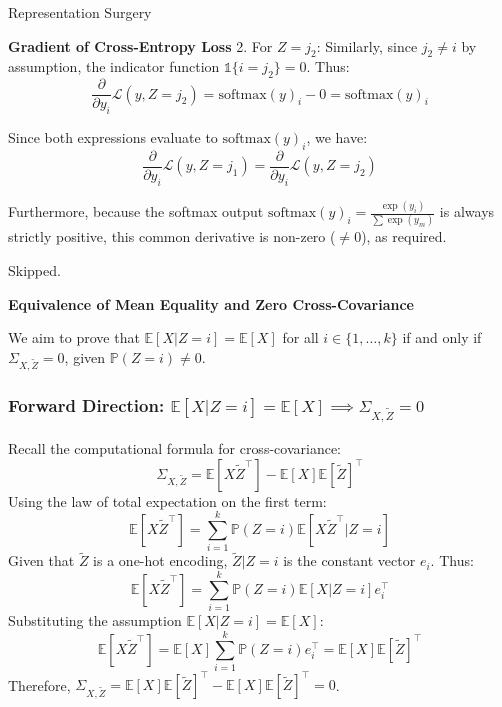 \begin{question}{Representation Surgery}
\begin{subquestion}{\textbf{Gradient of Cross-Entropy Loss}}
2. For $Z = j_2$: 
Similarly, since $j_2 \neq i$ by assumption, the indicator function $\mathbb{1}\{i=j_2\} = 0$. Thus:
$$\frac{\partial}{\partial y_i} \mathcal{L}(y, Z=j_2) = \text{softmax}(y)_i - 0 = \text{softmax}(y)_i$$

Since both expressions evaluate to $\text{softmax}(y)_i$, we have:
$$\frac{\partial}{\partial y_i} \mathcal{L}(y, Z=j_1) = \frac{\partial}{\partial y_i} \mathcal{L}(y, Z=j_2)$$

Furthermore, because the softmax output $\text{softmax}(y)_i = \frac{\exp(y_i)}{\sum \exp(y_m)}$ is always strictly positive, this common derivative is non-zero ($\ne 0$), as required.

\end{subquestion}

\begin{subquestion}
Skipped.
\end{subquestion}

\begin{subquestion}{\textbf{Equivalence of Mean Equality and Zero Cross-Covariance}}

We aim to prove that $\mathbb{E}[X|Z=i] = \mathbb{E}[X]$ for all $i \in \{1, \dots, k\}$ if and only if $\Sigma_{X,\tilde{Z}} = 0$, given $\mathbb{P}(Z=i) \neq 0$.

\subsubsection*{Forward Direction: $\mathbb{E}[X|Z=i] = \mathbb{E}[X] \implies \Sigma_{X,\tilde{Z}} = 0$}
Recall the computational formula for cross-covariance:
$$\Sigma_{X,\tilde{Z}} = \mathbb{E}[X\tilde{Z}^\top] - \mathbb{E}[X]\mathbb{E}[\tilde{Z}]^\top$$
Using the law of total expectation on the first term:
$$\mathbb{E}[X\tilde{Z}^\top] = \sum_{i=1}^k \mathbb{P}(Z=i) \mathbb{E}[X\tilde{Z}^\top | Z=i]$$
Given that $\tilde{Z}$ is a one-hot encoding, $\tilde{Z} | Z=i$ is the constant vector $e_i$. Thus:
$$\mathbb{E}[X\tilde{Z}^\top] = \sum_{i=1}^k \mathbb{P}(Z=i) \mathbb{E}[X | Z=i] e_i^\top$$
Substituting the assumption $\mathbb{E}[X|Z=i] = \mathbb{E}[X]$:
$$\mathbb{E}[X\tilde{Z}^\top] = \mathbb{E}[X] \sum_{i=1}^k \mathbb{P}(Z=i) e_i^\top = \mathbb{E}[X] \mathbb{E}[\tilde{Z}]^\top$$
Therefore, $\Sigma_{X,\tilde{Z}} = \mathbb{E}[X]\mathbb{E}[\tilde{Z}]^\top - \mathbb{E}[X]\mathbb{E}[\tilde{Z}]^\top = 0$.


\end{subquestion}
\end{question}
